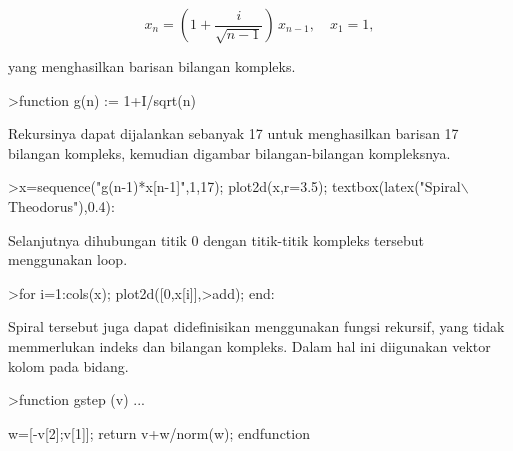 \documentclass{article}
\begin{document}
\begin{eulernotebook}
\begin{eulercomment}
\begin{eulercomment}
\begin{eulercomment}
\begin{eulercomment}
\begin{eulercomment}
\begin{eulercomment}
\begin{eulercomment}
\begin{eulercomment}
\begin{eulercomment}
\end{eulercomment}
\begin{eulerformula}
\[
x_n = \left( 1 + \frac{i}{\sqrt{n-1}} \right) \, x_{n-1}, \quad x_1=1,
\]
\end{eulerformula}
\begin{eulercomment}
yang menghasilkan barisan bilangan kompleks.
\end{eulercomment}
\begin{eulerprompt}
>function g(n) := 1+I/sqrt(n)
\end{eulerprompt}
\begin{eulercomment}
Rekursinya dapat dijalankan sebanyak 17 untuk menghasilkan barisan 17
bilangan kompleks, kemudian digambar bilangan-bilangan kompleksnya.
\end{eulercomment}
\begin{eulerprompt}
>x=sequence("g(n-1)*x[n-1]",1,17); plot2d(x,r=3.5); textbox(latex("Spiral\(\backslash\) Theodorus"),0.4):
\end{eulerprompt}
\begin{eulercomment}
Selanjutnya dihubungan titik 0 dengan titik-titik kompleks tersebut
menggunakan loop.
\end{eulercomment}
\begin{eulerprompt}
>for i=1:cols(x); plot2d([0,x[i]],>add); end:
\end{eulerprompt}
\begin{eulercomment}
Spiral tersebut juga dapat didefinisikan menggunakan fungsi rekursif,
yang tidak memmerlukan indeks dan bilangan kompleks. Dalam hal ini
diigunakan vektor kolom pada bidang.
\end{eulercomment}
\begin{eulerprompt}
>function gstep (v) ...
\end{eulerprompt}
\begin{eulerudf}
  w=[-v[2];v[1]];
  return v+w/norm(w);
  endfunction
\end{eulerudf}
\begin{eulerudf}
  

\end{eulerudf}
\end{eulercomment}
\end{eulercomment}
\end{eulercomment}
\end{eulercomment}
\end{eulercomment}
\end{eulercomment}
\end{eulercomment}
\end{eulercomment}
\end{eulernotebook}
\end{document}
